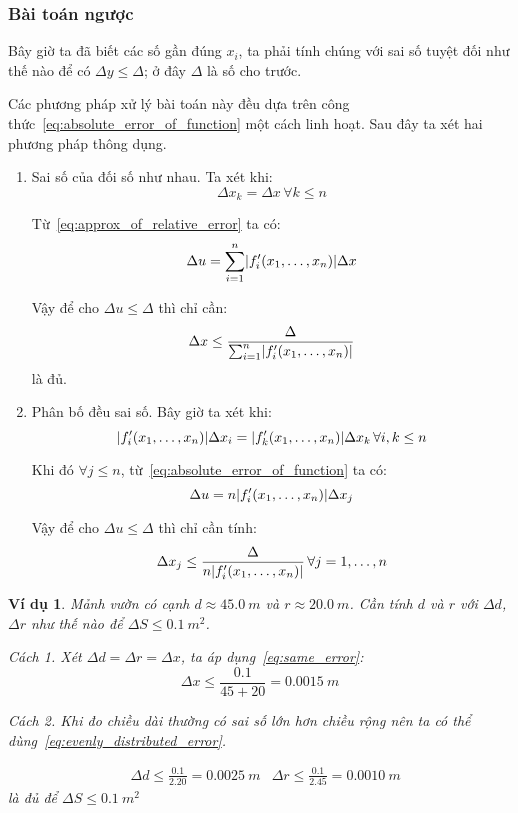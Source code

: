 \documentclass{book}
\newtheorem{exmp}{Ví dụ}[chapter]
\DeclarePairedDelimiter\abs{\lvert}{\rvert}%
\begin{document}
\subsubsection{Bài toán ngược}

Bây giờ ta đã biết các số gần đúng \(x_i\), ta phải tính chúng với sai số tuyệt
đối như thế nào để có \(\Delta y \leq \Delta\); ở đây \(\Delta\) là số cho
trước.

Các phương pháp xử lý bài toán này đều dựa trên công thức~\ref{eq:absolute_error_of_function}
một cách linh hoạt. Sau đây ta xét hai phương pháp thông dụng.

\begin{enumerate}
    \item Sai số của  đối số như nhau.
        Ta xét khi:
        \[\Delta x_k = \Delta x \, \forall k \leq n\]

        Từ~\ref{eq:approx_of_relative_error} ta có:
        \[\Delta u = \sum_{i=1}^{n} \abs{f'_i(x_1, \ldots, x_n)} \Delta x\]

        Vậy để cho \(\Delta u \leq \Delta\) thì chỉ cần:
        \begin{equation}\label{eq:same_error}
            \Delta x \leq \frac{\Delta}{\sum_{i=1}^{n} \abs{f'_i(x_1, \ldots, x_n)}}
        \end{equation}
        là đủ.

    \item Phân bố đều sai số.
        Bây giờ ta xét khi:
        \[\abs{f'_i(x_1, \ldots, x_n)} \Delta x_i = \abs{f'_k(x_1, \ldots, x_n)} \Delta x_k \, \forall i, k \leq n\]

        Khi đó \(\forall j \leq n\), từ~\ref{eq:absolute_error_of_function} ta có:
        \[\Delta u = n \abs{f'_i(x_1, \ldots, x_n)} \Delta x_j\]

        Vậy để cho \(\Delta u \leq \Delta\) thì chỉ cần tính:
        \begin{equation}\label{eq:evenly_distributed_error}
            \Delta x_j \leq \frac{\Delta}{n \abs{f'_i(x_1, \ldots, x_n)}} \, \forall j = 1, \ldots, n
        \end{equation}
\end{enumerate}

\begin{exmp}
    Mảnh vườn có cạnh \(d \approx \SI{45.0}{m}\) và \(r \approx
    \SI{20.0}{m}\). Cần tính \(d\) và \(r\) với \(\Delta d\), \(\Delta r\) như
    thế nào để \(\Delta S \leq \SI{0.1}{m^2}\).

    \emph{Cách 1.}
    Xét \(\Delta d = \Delta r = \Delta x\), ta áp dụng~\ref{eq:same_error}:
    \[\Delta x \leq \frac{\num{0.1}}{45 + 20} = \SI{0.0015}{m}\]

    \emph{Cách 2.}
    Khi đo chiều dài thường có sai số lớn hơn chiều rộng nên ta có thể
    dùng~\ref{eq:evenly_distributed_error}.

    \[\begin{aligned}
        &\Delta d \leq \frac{\num{0.1}}{\num{2.20}} = \SI{0.0025}{m}
        &\Delta r \leq \frac{\num{0.1}}{\num{2.45}} = \SI{0.0010}{m}
    \end{aligned}\]
    là đủ để \(\Delta S \leq \SI{0.1}{m^2}\)
\end{exmp}
\end{document}
